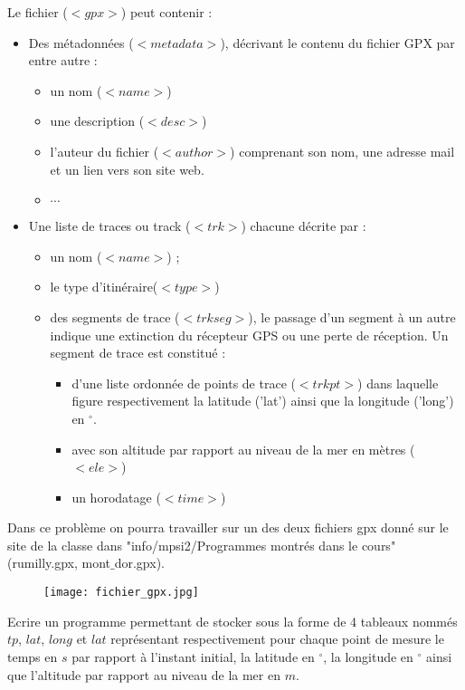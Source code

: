 Le fichier ($<gpx>$) peut contenir :
\begin{itemize}
\item Des métadonnées ($<metadata>$), décrivant le contenu du fichier GPX par entre autre :
\begin{itemize}
\item un nom ($<name>$)
\item une description ($<desc>$)
\item l'auteur du fichier ($<author>$) comprenant son nom, une adresse mail et un lien vers son site web.
\item $\cdots$
\end{itemize}
\item Une liste de traces ou track ($<trk>$) chacune décrite par :
\begin{itemize}
\item un nom ($<name>$) ;
\item  le type d'itinéraire($<type>$)
\item des segments de trace ($<trkseg>$), le passage d'un segment à un autre indique une extinction du récepteur GPS ou une perte de réception. Un segment de trace est constitué :
\begin{itemize}
\item d'une liste ordonnée de points de trace ($<trkpt>$) dans laquelle figure respectivement la latitude ('lat') ainsi que la longitude ('long') en $^{\circ}$.
\item avec son altitude par rapport au niveau de la mer en mètres ($<ele>$)
\item un horodatage ($<time>$)
\end{itemize}
\end{itemize}
\end{itemize}

Dans ce problème on pourra travailler sur un des deux fichiers gpx donné sur le site de la classe dans "info/mpsi2/Programmes montrés dans le cours"(rumilly.gpx, mont$\_$dor.gpx).

\begin{figure}[!htb]
\begin{center}
\texttt{[image: fichier\_gpx.jpg]}
\end{center}
\end{figure}

\question{} Ecrire un programme permettant de stocker sous la forme de 4 tableaux nommés $tp$, $lat$, $long$ et $lat$ représentant respectivement pour chaque point de mesure le temps en $s$ par rapport à l'instant initial, la latitude en $^{\circ}$, la longitude en $^{\circ}$ ainsi que l'altitude par rapport au niveau de la mer en $m$.

